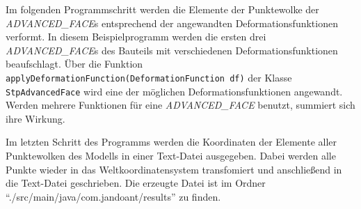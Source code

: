Im folgenden Programmschritt werden die Elemente der Punktewolke der \textit{ADVANCED\_FACE}s entsprechend der angewandten Deformationsfunktionen verformt. In diesem Beispielprogramm werden die ersten drei \textit{ADVANCED\_FACE}s des Bauteils mit verschiedenen Deformationsfunktionen beaufschlagt. Über die Funktion \verb|applyDeformationFunction(DeformationFunction df)| der Klasse \verb|StpAdvancedFace| wird eine der möglichen Deformationsfunktionen angewandt.
Werden mehrere Funktionen für eine \textit{ADVANCED\_FACE} benutzt, summiert sich ihre Wirkung. 

Im letzten Schritt des Programms werden die Koordinaten der Elemente aller Punktewolken des Modells in einer Text-Datei ausgegeben. Dabei werden alle Punkte wieder in das Weltkoordinatensystem transfomiert und anschließend in die Text-Datei geschrieben. Die erzeugte Datei ist im Ordner {"`./src/\-main/\-java/\-com.jandoant/results"'} zu finden. 

 

 






         




    




           




           


       

        








    













  
